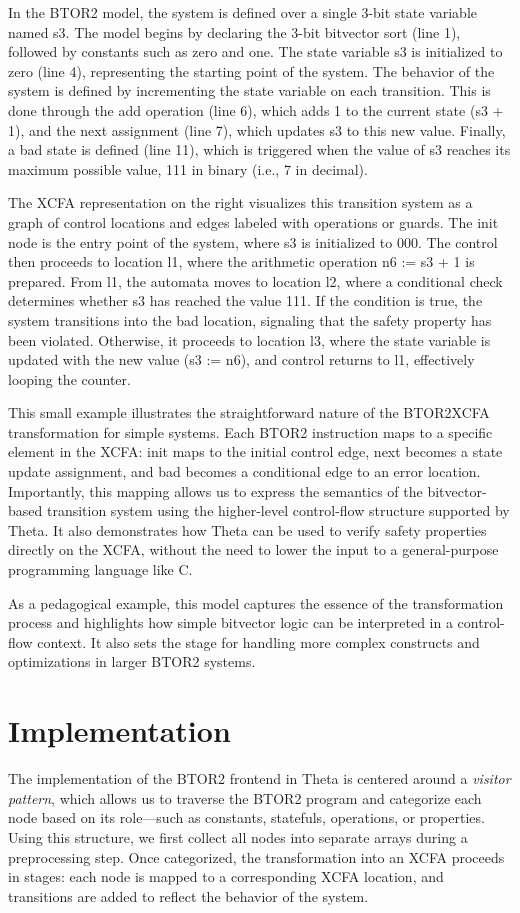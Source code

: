 In the BTOR2 model, the system is defined over a single 3-bit state variable named s3. The model begins by declaring the 3-bit bitvector sort (line 1), followed by constants such as zero and one. The state variable s3 is initialized to zero (line 4), representing the starting point of the system. The behavior of the system is defined by incrementing the state variable on each transition. This is done through the add operation (line 6), which adds 1 to the current state (s3 + 1), and the next assignment (line 7), which updates s3 to this new value. Finally, a bad state is defined (line 11), which is triggered when the value of s3 reaches its maximum possible value, 111 in binary (i.e., 7 in decimal).

The XCFA representation on the right visualizes this transition system as a graph of control locations and edges labeled with operations or guards. The init node is the entry point of the system, where s3 is initialized to 000. The control then proceeds to location l1, where the arithmetic operation n6 := s3 + 1 is prepared. From l1, the automata moves to location l2, where a conditional check determines whether s3 has reached the value 111. If the condition is true, the system transitions into the bad location, signaling that the safety property has been violated. Otherwise, it proceeds to location l3, where the state variable is updated with the new value (s3 := n6), and control returns to l1, effectively looping the counter.

This small example illustrates the straightforward nature of the BTOR2XCFA transformation for simple systems. Each BTOR2 instruction maps to a specific element in the XCFA: init maps to the initial control edge, next becomes a state update assignment, and bad becomes a conditional edge to an error location. Importantly, this mapping allows us to express the semantics of the bitvector-based transition system using the higher-level control-flow structure supported by Theta. It also demonstrates how Theta can be used to verify safety properties directly on the XCFA, without the need to lower the input to a general-purpose programming language like C.

As a pedagogical example, this model captures the essence of the transformation process and highlights how simple bitvector logic can be interpreted in a control-flow context. It also sets the stage for handling more complex constructs and optimizations in larger BTOR2 systems.

\section{Implementation}
The implementation of the BTOR2 frontend in Theta is centered around a \textit{visitor pattern}, which allows us to traverse the BTOR2 program and categorize each node based on its role—such as constants, statefuls, operations, or properties. Using this structure, we first collect all nodes into separate arrays during a preprocessing step. Once categorized, the transformation into an XCFA proceeds in stages: each node is mapped to a corresponding XCFA location, and transitions are added to reflect the behavior of the system.

